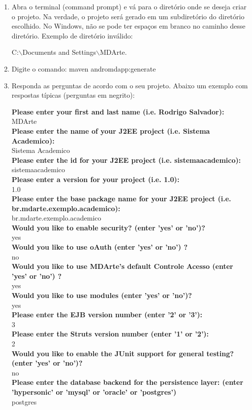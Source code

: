 \begin{enumerate}
\item Abra o terminal (command prompt) e vá para o diretório onde se deseja
criar o projeto. Na verdade, o projeto será gerado em um subdiretório do diretório escolhido. No Windows, não se pode ter espaços em branco no caminho desse diretório. Exemplo de diretório inválido:

C:$\backslash$Documents and Settings$\backslash$MDArte.

\item Digite o comando: maven andromdapp:generate

\item Responda as perguntas de acordo com o seu projeto. Abaixo um exemplo com respostas típicas (perguntas em negrito):

\textbf{Please enter your first and last name (i.e. Rodrigo Salvador):} \\
MDArte\\
\textbf{Please enter the name of your J2EE project (i.e. Sistema Academico):}\\
Sistema Academico\\
\textbf{Please enter the id for your J2EE project (i.e. sistemaacademico):}\\
sistemaacademico\\
\textbf{Please enter a version for your project (i.e. 1.0):}\\
1.0\\
\textbf{Please enter the base package name for your J2EE project (i.e. br.mdarte.exemplo.academico):}\\
br.mdarte.exemplo.academico\\
\textbf{Would you like to enable security? (enter 'yes' or 'no')?}\\
yes\\
\textbf{Would you like to use oAuth (enter 'yes' or 'no') ?}\\
no\\
\textbf{Would you like to use MDArte's default Controle Acesso (enter 'yes' or
'no') ?}\\
yes\\
\textbf{Would you like to use modules (enter 'yes' or 'no')?}\\
yes\\
\textbf{Please enter the EJB version number (enter '2' or '3'):}\\
3\\
\textbf{Please enter the Struts version number (enter '1' or '2'):}\\
2\\
\textbf{Would you like to enable the JUnit support for general testing? (enter
'yes' or 'no')? }\\
 no\\
\textbf{Please enter the database backend for the persistence layer: (enter
'hypersonic' or 'mysql' or 'oracle' or 'postgres')}\\
 postgres\\
 

\end{enumerate}
